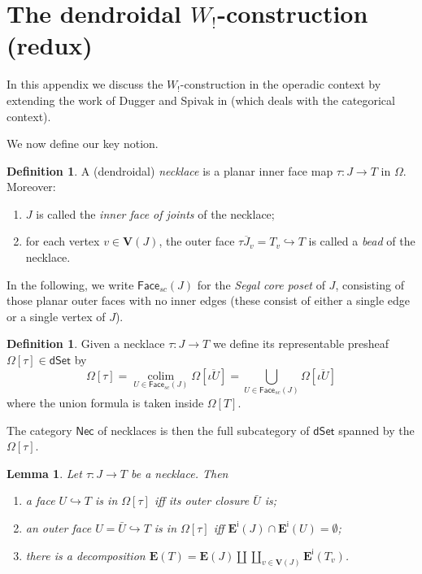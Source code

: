\documentclass[a4paper,10pt
,draft
]{article}%
\numberwithin{equation}{section}
\numberwithin{figure}{section}
\newtheorem{lemma}[equation]{Lemma}%
\theoremstyle{definition} %
\newtheorem{definition}[equation]{Definition}%
\DeclareMathOperator{\colim}{colim}%
\newcommand{\1}{\ensuremath{\mathbbm 1}}%
\begin{document}
\section{The dendroidal $W_!$-construction (redux)}
\label{WCONS AP}



In this appendix we discuss the 
$W_!$-construction in the operadic context by extending the  
work of Dugger and Spivak in \cite{DS11} 
(which deals with the categorical context).


We now define our key notion.

\begin{definition}
	A (dendroidal) \emph{necklace} is 
	a planar inner face map
	$\tau \colon J \to T$
	in $\Omega$.
	Moreover:
	\begin{enumerate}[label = (\roman*)]
		\item 
		$J$ is called the \emph{inner face of joints} of the necklace;
		\item for each vertex $v \in \boldsymbol{V}(J)$,
		the outer face
		$\overline{\tau J_v} = T_v \hookrightarrow T$
		is called a \emph{bead} of the necklace.
	\end{enumerate}
\end{definition}

In the following, we write 
$\mathsf{Face}_{sc}(J)$ for the \emph{Segal core poset} of $J$,
consisting of those planar outer faces with no inner edges
(these consist of either a single edge or a single vertex of $J$).



\begin{definition}
	Given a necklace $\tau \colon J \to T$ 
	we define its representable presheaf
	$\Omega[\tau] \in \mathsf{dSet}$ by
	\begin{equation}
	\Omega[\tau] 
	= 
	\underset{U \in \mathsf{Face}_{sc}(J)}{\colim}
	\Omega[\overline{\iota U}]
	=
	\bigcup_{U \in \mathsf{Face}_{sc}(J)} 
	\Omega[\overline{\iota U}]
	\end{equation}
	where the union formula is taken inside $\Omega[T]$.
	
	The category $\mathsf{Nec}$ of necklaces is then the full subcategory of $\mathsf{dSet}$
	spanned by the $\Omega[\tau]$.
\end{definition}



\begin{lemma}\label{FACEINNECK LEM}
	Let $\tau \colon J \to T$ be a necklace. Then
	\begin{enumerate}[label=(\roman*)]
		\item a face $U \hookrightarrow T$
		is in $\Omega[\tau]$
		iff its outer closure $\bar{U}$ is; 
		\item an outer face 
		$U = \bar{U} \hookrightarrow T$
		is in $\Omega[\tau]$ iff 
		$\boldsymbol{E}^{\mathsf{i}}(J) \cap 
		\boldsymbol{E}^{\mathsf{i}}(U) = \emptyset$;
		\item there is a decomposition
		$
		\boldsymbol{E}(T) = 
		\boldsymbol{E}(J) \amalg 
		\coprod_{v \in \boldsymbol{V}(J)}
		\boldsymbol{E}^{\mathsf{i}}(T_v)
		$.
	\end{enumerate}
\end{lemma}
\end{document}
